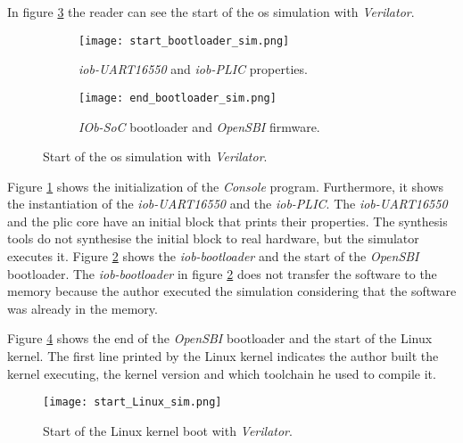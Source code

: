 In figure \ref{fig:bootloader_sim} the reader can see the start of the \acrshort{os} simulation with \textit{Verilator}.

\begin{figure}[!ht]
    \centering
    \begin{subfigure}[b]{0.49\textwidth}
        \centering
        \texttt{[image: start\_bootloader\_sim.png]}
        \caption{\textit{iob-UART16550} and \textit{iob-PLIC} properties.}
        \label{fig:start_bootloader_sim}
    \end{subfigure}
    \hfill
    \begin{subfigure}[b]{0.49\textwidth}
        \centering
        \texttt{[image: end\_bootloader\_sim.png]}
        \caption{\textit{IOb-SoC} bootloader and \textit{OpenSBI} firmware.}
        \label{fig:end_bootloader_sim}
    \end{subfigure}
    \caption{Start of the \acrshort{os} simulation with \textit{Verilator}.}
    \label{fig:bootloader_sim}
\end{figure}

Figure \ref{fig:start_bootloader_sim} shows the initialization of the \textit{Console} program. Furthermore, it shows the instantiation of the \textit{iob-UART16550} and the \textit{iob-PLIC}. The \textit{iob-UART16550} and the \acrshort{plic} core have an initial block that prints their properties. The synthesis tools do not synthesise the initial block to real hardware, but the simulator executes it. Figure \ref{fig:end_bootloader_sim} shows the \textit{iob-bootloader} and the start of the \textit{OpenSBI} bootloader. The \textit{iob-bootloader} in figure \ref{fig:end_bootloader_sim} does not transfer the software to the memory because the author executed the simulation considering that the software was already in the memory.

Figure \ref{fig:start_linux_sim} shows the end of the \textit{OpenSBI} bootloader and the start of the Linux kernel. The first line printed by the Linux kernel indicates the author built the kernel executing, the kernel version and which toolchain he used to compile it.

\begin{figure}[!ht]
    \centering
    \centering
    \texttt{[image: start\_Linux\_sim.png]}
    \caption{Start of the Linux kernel boot with \textit{Verilator}.}
    \label{fig:start_linux_sim}
\end{figure}

